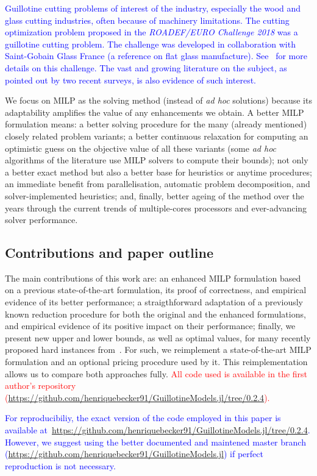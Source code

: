 \documentclass[smallextended]{svjour3}       %
\newif\iffinalversion
\newcommand{\newtext}[1]{\iffinalversion%
#1%
\else%
\textcolor{blue}{#1}%
\fi%
}
\newcommand{\oldtext}[1]{\iffinalversion%
#1%
\else%
\textcolor{red}{#1}%
\fi%
}
\begin{document}
\newtext{Guillotine cutting problems of interest of the industry, especially the wood\cite{yanasse:linear:2008,morabito:hardboard:2007} and glass cutting industries\cite{clautiaux:2019,parreno:2020}, often because of machinery limitations. The cutting optimization problem proposed in the \emph{ROADEF/EURO Challenge 2018} was a guillotine cutting problem. The challenge was developed in collaboration with Saint-Gobain Glass France (a reference on flat glass manufacture). See~\cite{parreno:2020} for more details on this challenge. The vast and growing literature on the subject, as pointed out by two recent surveys\cite{iori:2020,russo:2020}, is also evidence of such interest.}

We focus on MILP as the solving method (instead of \emph{ad hoc} solutions) because its adaptability amplifies the value of any enhancements we obtain.
A better MILP formulation means:
a better solving procedure for the many (already mentioned) closely related problem variants;
a better continuous relaxation for computing an optimistic guess on the objective value of all these variants (some \emph{ad hoc} algorithms of the literature use MILP solvers to compute their bounds);
not only a better exact method but also a better base for heuristics or anytime procedures;
an immediate benefit from parallelisation, automatic problem decomposition, and solver-implemented heuristics;
and, finally, better ageing of the method over the years through the current trends of multiple-cores processors and ever-advancing solver performance.

\subsection{Contributions and paper outline}

The main contributions of this work are:
an enhanced MILP formulation based on a previous state-of-the-art formulation, its proof of correctness, and empirical evidence of its better performance;
a straigthforward adaptation of a previously known reduction procedure for both the original and the enhanced formulations, and empirical evidence of its positive impact on their performance;
finally, we present new upper and lower bounds, as well as optimal values, for many recently proposed hard instances from~\cite{velasco:2019}.
For such, we reimplement a state-of-the-art MILP formulation and an optional pricing procedure used by it.
This reimplementation allows us to compare both approaches fully.
\oldtext{All code used is available in the first author's repository ({\small\url{https://github.com/henriquebecker91/GuillotineModels.jl/tree/0.2.4}}).}
\newtext{For reproducibiliy, the exact version of the code employed in this paper is available at~{\small\url{https://github.com/henriquebecker91/GuillotineModels.jl/tree/0.2.4}}. However, we suggest using the better documented and maintened master branch ({\small\url{https://github.com/henriquebecker91/GuillotineModels.jl}}) if perfect reproduction is not necessary.}
\end{document}
